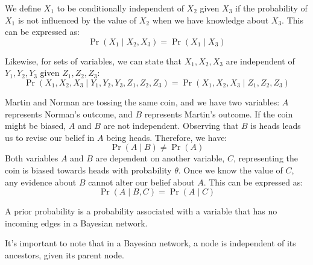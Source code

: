 \begin{definition}
    We define $X_1$ to be conditionally independent of $X_2$ given $X_3$ if the probability of $X_1$ is not influenced by the value of $X_2$ when we have knowledge about $X_3$.  
    This can be expressed as:
    \[\Pr(X_1\mid X_2,X_3)=\Pr(X_1\mid X_3)\]
\end{definition}
Likewise, for sets of variables, we can state that $X_1, X_2, X_3$ are independent of $Y_1, Y_2, Y_3$ given $Z_1,Z_2,Z_3$:
\[\Pr(X_1,X_2,X_3\mid Y_1,Y_2,Y_3,Z_1,Z_2,Z_3)=\Pr(X_1,X_2,X_3\mid Z_1,Z_2,Z_3)\]
\begin{example}
    Martin and Norman are tossing the same coin, and we have two variables: $A$ represents Norman's outcome, and $B$ represents Martin's outcome. 
    If the coin might be biased, $A$ and $B$ are not independent. 
    Observing that $B$ is heads leads us to revise our belief in $A$ being heads. 
    Therefore, we have:
    \[\Pr(A\mid B) \neq \Pr(A)\]
    Both variables $A$ and $B$ are dependent on another variable, $C$, representing the coin is biased towards heads with probability $\theta$.
    Once we know the value of $C$, any evidence about $B$ cannot alter our belief about $A$.
    This can be expressed as:
    \[\Pr(A\mid B,C)=\Pr(A\mid C)\]
\end{example}
\begin{definition}
    A prior probability is a probability associated with a variable that has no incoming edges in a Bayesian network. 
\end{definition}
It's important to note that in a Bayesian network, a node is independent of its ancestors, given its parent node.
